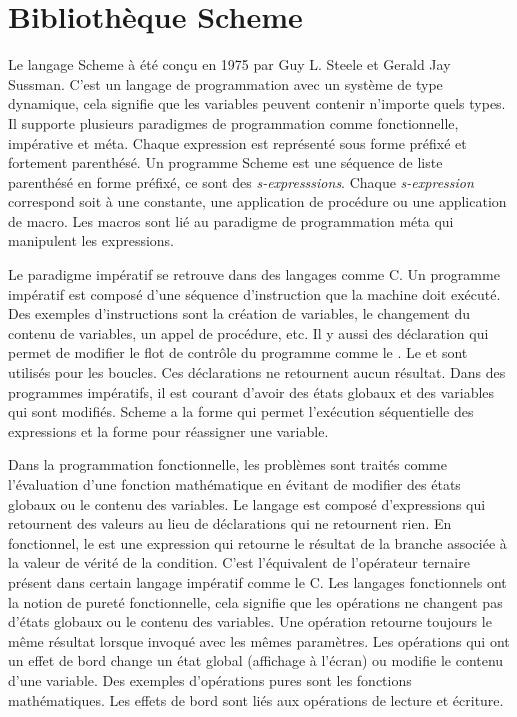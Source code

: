 
\chapter{Bibliothèque Scheme}

Le langage Scheme\cite{Scheme} à été conçu en 1975 par Guy L. Steele et Gerald
Jay Sussman.  C'est un langage de programmation avec un système de type
dynamique, cela signifie que les variables peuvent contenir n'importe quels
types. Il supporte plusieurs paradigmes de programmation comme fonctionnelle,
impérative et méta. Chaque expression est représenté sous forme préfixé et
fortement parenthésé.  Un programme Scheme est une séquence de liste parenthésé
en forme préfixé, ce sont des \textit{s-expresssions}.  Chaque
\textit{s-expression} correspond soit à une constante, une application de
procédure ou une application de macro. Les macros sont lié au paradigme de
programmation méta qui manipulent les expressions.

Le paradigme impératif se retrouve dans des langages comme C. Un programme
impératif est composé d'une séquence d'instruction que la machine doit exécuté.
Des exemples d'instructions sont la création de variables, le changement du
contenu de variables, un appel de procédure, etc. Il y aussi des déclaration
qui permet de modifier le flot de contrôle du programme comme le .
Le  et  sont utilisés pour les boucles. Ces
déclarations ne retournent aucun résultat.  Dans des programmes impératifs, il est
courant d'avoir des états globaux et des variables qui sont
modifiés. Scheme a la forme  qui permet l'exécution
séquentielle des expressions et la forme  pour réassigner une
variable.


Dans la programmation fonctionnelle, les problèmes sont traités comme
l'évaluation d'une fonction mathématique en évitant de modifier des états
globaux ou le contenu des variables. Le langage est composé d'expressions qui
retournent des valeurs au lieu de déclarations qui ne retournent rien. En
fonctionnel, le  est une expression qui retourne le résultat de la
branche associée à la valeur de vérité de la condition. C'est l'équivalent de
l'opérateur ternaire présent dans certain langage impératif comme  le C. Les
langages fonctionnels ont la notion de pureté fonctionnelle, cela signifie que
les opérations ne changent pas d'états globaux ou le contenu des variables. Une
opération retourne toujours le même résultat lorsque invoqué avec les mêmes
paramètres. Les opérations qui ont un effet de bord change un état global
(affichage à l'écran) ou modifie le contenu d'une variable.  Des exemples
d'opérations pures sont les fonctions mathématiques. Les effets de bord sont
liés aux opérations de lecture et écriture.

